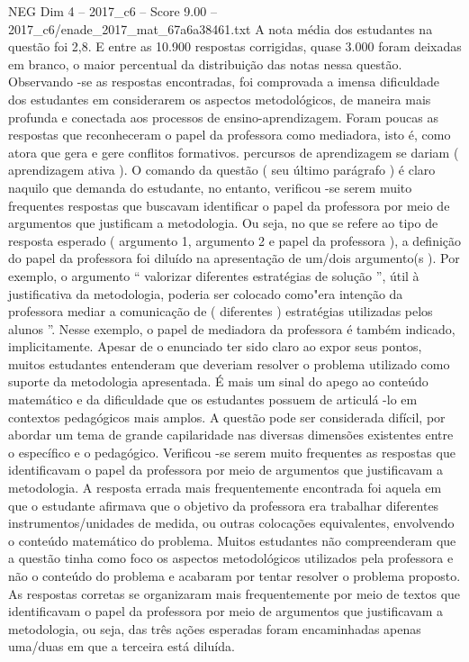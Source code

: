 \begin{textsample}{NEG Dim 4 – 2017\_c6 – Score 9.00 – 2017\_c6/enade\_2017\_mat\_67a6a38461.txt}
A nota média dos estudantes na questão foi 2,8.
E entre as 10.900 respostas corrigidas, quase 3.000 foram deixadas em branco, o maior percentual da distribuição das notas nessa questão.
Observando -se as respostas encontradas, foi comprovada a imensa dificuldade dos estudantes em considerarem os aspectos metodológicos, de maneira mais profunda e conectada aos processos de ensino-aprendizagem.
Foram poucas as respostas que reconheceram o papel da professora como mediadora, isto é, como atora que gera e gere conflitos formativos. percursos de aprendizagem se dariam ( aprendizagem ativa ).
O comando da questão ( seu último parágrafo ) é claro naquilo que demanda do estudante, no entanto, verificou -se serem muito frequentes respostas que buscavam identificar o papel da professora por meio de argumentos que justificam a metodologia.
Ou seja, no que se refere ao tipo de resposta esperado ( argumento 1, argumento 2 e papel da professora ), a definição do papel da professora foi diluído na apresentação de um/dois argumento(s ).
Por exemplo, o argumento “ valorizar diferentes estratégias de solução ”, útil à justificativa da metodologia, poderia ser colocado como"era intenção da professora mediar a comunicação de ( diferentes ) estratégias utilizadas pelos alunos ”.
Nesse exemplo, o papel de mediadora da professora é também indicado, implicitamente.
Apesar de o enunciado ter sido claro ao expor seus pontos, muitos estudantes entenderam que deveriam resolver o problema utilizado como suporte da metodologia apresentada.
É mais um sinal do apego ao conteúdo matemático e da dificuldade que os estudantes possuem de articulá -lo em contextos pedagógicos mais amplos.
A questão pode ser considerada difícil, por abordar um tema de grande capilaridade nas diversas dimensões existentes entre o específico e o pedagógico.
Verificou -se serem muito frequentes as respostas que identificavam o papel da professora por meio de argumentos que justificavam a metodologia.
A resposta errada mais frequentemente encontrada foi aquela em que o estudante afirmava que o objetivo da professora era trabalhar diferentes instrumentos/unidades de medida, ou outras colocações equivalentes, envolvendo o conteúdo matemático do problema.
Muitos estudantes não compreenderam que a questão tinha como foco os aspectos metodológicos utilizados pela professora e não o conteúdo do problema e acabaram por tentar resolver o problema proposto.
As respostas corretas se organizaram mais frequentemente por meio de textos que identificavam o papel da professora por meio de argumentos que justificavam a metodologia, ou seja, das três ações esperadas foram encaminhadas apenas uma/duas em que a terceira está diluída.

\end{textsample}
